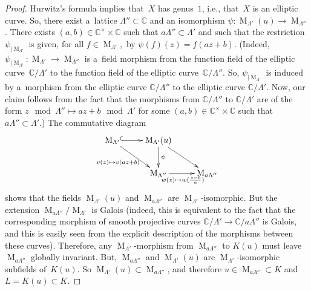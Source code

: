 \documentclass[10pt,a4paper]{amsart}
\numberwithin{equation}{section}
\begin{document}
\begin{proof}
Hurwitz's formula implies that~$X$ has genus~$1$, i.e., that~$X$ is an elliptic curve.
So, there exist a~lattice $\Lambda'' \subset \mathbb C$ and an isomorphism $\psi: \operatorname{M}_{\Lambda'}(u)
\rightarrow \operatorname{M}_{\Lambda''}$.
There exists $(a,b) \in \mathbb C^{\times} \times \mathbb C$ such that $a \Lambda'' \subset \Lambda'$ and such that the
restriction $\psi_{\vert \operatorname{M}_{\Lambda'}}$ is given, for all $f \in \operatorname{M}_{\Lambda'}$,~by
$\psi(f)(z)=f(az+b)$.
(Indeed, $\psi_{\vert \operatorname{M}_{\Lambda'}}: \operatorname{M}_{\Lambda'} \rightarrow
\operatorname{M}_{\Lambda''}$ is a~f\/ield morphism from the function f\/ield of the elliptic curve~$\mathbb C/\Lambda'$ to
the function f\/ield of the elliptic curve~$\mathbb C/\Lambda''$.
So, $\psi_{\vert \operatorname{M}_{\Lambda'}}$ is induced by a~morphism from the elliptic curve $\mathbb C/\Lambda''$ to
the elliptic curve $\mathbb C/\Lambda'$.
Now, our claim follows from the fact that the morphisms from $\mathbb C/\Lambda''$ to $\mathbb C/\Lambda'$ are of the
form $z \mod \Lambda'' \mapsto az+b \mod \Lambda'$ for some $(a,b) \in \mathbb C^{\times} \times \mathbb C$ such that $a
\Lambda'' \subset \Lambda'$.) The commutative diagram
\begin{gather*}
\xymatrix{\operatorname{M}_{\Lambda'} \ar@{^{(}->}[r] \ar[rd]_{v(z) \mapsto v(az+b)} &  \operatorname{M}_{\Lambda'}(u)
\ar[d]^{\psi} \ar[rd] &
\\
&  \operatorname{M}_{\Lambda''} \ar[r]_{w(z) \mapsto w(\frac{z-b}{a})}  & \operatorname{M}_{a \Lambda''}}
\end{gather*}
shows that the f\/ields $\operatorname{M}_{\Lambda'}(u)$ and $\operatorname{M}_{a \Lambda''}$ are
$\operatorname{M}_{\Lambda'}$-isomorphic.
But the extension $\operatorname{M}_{a \Lambda''}/\operatorname{M}_{\Lambda'}$ is Galois (indeed, this is equivalent to
the fact that the corresponding morphism of smooth projective curves $\mathbb C/\Lambda' \rightarrow \mathbb
C/a\Lambda''$ is Galois, and this is easily seen from the explicit description of the morphisms between these curves).
Therefore, any $\operatorname{M}_{\Lambda'}$-morphism from $\operatorname{M}_{a \Lambda''}$ to $K (u)$ must leave
$\operatorname{M}_{a \Lambda''}$ globally invariant.
But, $\operatorname{M}_{a \Lambda''}$ and $\operatorname{M}_{\Lambda'}(u)$ are $\operatorname{M}_{\Lambda'}$-isomorphic
subf\/ields of~$K(u)$.
So $\operatorname{M}_{\Lambda'} (u) \subset \operatorname{M}_{a \Lambda''}$, and therefore $u \in \operatorname{M}_{a
\Lambda''} \subset K$ and $L=K(u) \subset K$.
\end{proof}
\end{document}
